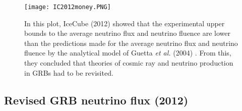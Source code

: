 \documentclass[12pt]{article}
\begin{document}
\begin{doublespace}
\begin{figure}[H]
\centering
\texttt{[image: IC2012money.PNG]}
\caption{In this plot, IceCube (2012) showed that the experimental upper bounds to the average neutrino flux and neutrino fluence are lower than the predictions made for the average neutrino flux and neutrino fluence by the analytical model of Guetta \textit{et al.} (2004) \cite{guetta}. From this, they concluded that theories of cosmic ray and neutrino production in GRBs had to be revisited\cite{IC2012}.}
\label{IC2012money}
\end{figure}


\subsection{Revised GRB neutrino flux (2012)}


\end{doublespace}
\end{document}
